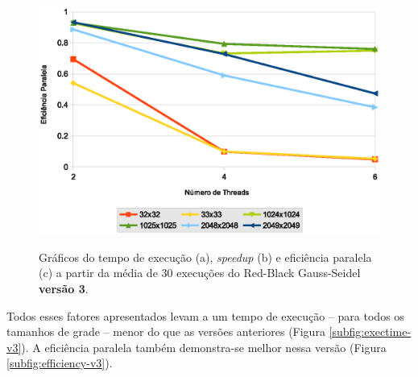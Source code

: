 \begin{figure}[H]
    \begin{minipage}{.5\textwidth}
        \includegraphics[width=\textwidth]{figures/efficiency-v3}
        \label{subfig:efficiency-v3}
    \end{minipage}%

    \caption{Gráficos do tempo de execução (a), \textit{speedup} (b) e eficiência paralela (c) a partir da média de 30 execuções do Red-Black Gauss-Seidel \textbf{versão 3}.}
    \label{fig:perf-v3}
\end{figure}

Todos esses fatores apresentados levam a um tempo de execução -- para todos os tamanhos de grade -- menor do que as versões anteriores (Figura \ref{subfig:exectime-v3}). A eficiência paralela também demonstra-se melhor nessa versão (Figura \ref{subfig:efficiency-v3}).